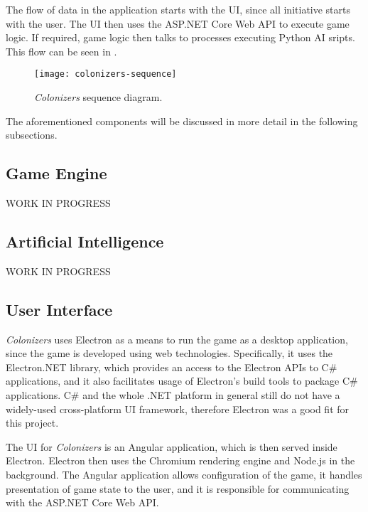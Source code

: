 The flow of data in the application starts with the UI, since all initiative starts
with the user. The UI then uses the ASP.NET Core Web API to execute game logic.
If required, game logic then talks to processes executing Python AI sripts.
This flow can be seen in .

\begin{figure}[ht]
\centerline{\mbox{\texttt{[image: colonizers-sequence]}}}
\caption{\emph{Colonizers} sequence diagram.}\label{dd:sequence}
\end{figure}

The aforementioned components will be discussed in more detail in the following subsections.

\subsection{Game Engine}

WORK IN PROGRESS

\subsection{Artificial Intelligence}
\label{chap:aidev}

WORK IN PROGRESS

\subsection{User Interface}

\emph{Colonizers} uses Electron as a means to run the game as a desktop application,
since the game is developed using web technologies. Specifically, it uses the
Electron.NET library, which provides an access to the Electron APIs to C\# applications,
and it also facilitates usage of Electron's build tools to package C\# applications.
C\# and the whole .NET platform in general still do not have a widely-used cross-platform
UI framework, therefore Electron was a good fit for this project.

The UI for \emph{Colonizers} is an Angular application, which is then served inside
Electron. Electron then uses the Chromium rendering engine and Node.js in the background.
The Angular application allows configuration of the game, it handles presentation
of game state to the user, and it is responsible for communicating with the
ASP.NET Core Web API.

